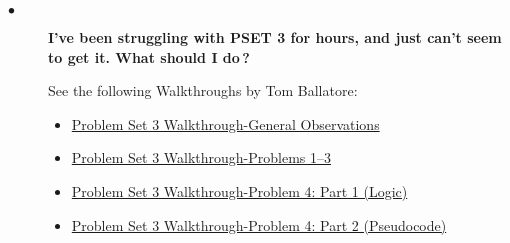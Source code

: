 \documentclass{article}
\newcommand{\link}[2]{\textcolor{blue}{\href{#2}{#1}}}
\newcommand{\question}[1]{\item[$\bullet$] 
	\begin{minipage}[t]{\textwidth}
		\bfseries#1
	\end{minipage}
	\hfil
}
\newenvironment{answer}{}{}
\newenvironment{faq}{\begin{description}}{\end{description}}
\begin{document}
\begin{faq}
		\question{I've been struggling with PSET 3 for hours, and just can't seem to get it.  What should I do\,?}
		\begin{answer}
			See the following Walkthroughs by Tom Ballatore:
			\begin{itemize}
				\item[] \link{Problem Set 3 Walkthrough-General Observations}{https://www.youtube.com/watch?v=W1k10qprERg\&index=8\&list=PL4e66Kzl1JCF0rL\_uq-w2yPBP3mDsm7iD\&t=0s}
				
				\item[] \link{Problem Set 3 Walkthrough-Problems 1--3}{https://www.youtube.com/watch?v=FKRPKI\_HH-0\&index=9\&list=PL4e66Kzl1JCF0rL\_uq-w2yPBP3mDsm7iD\&t=0s}
				
				\item[] \link{Problem Set 3 Walkthrough-Problem 4: Part 1 (Logic)}{https://www.youtube.com/watch?v=C7nRPJS7590\&index=10\&list=PL4e66Kzl1JCF0rL\_uq-w2yPBP3mDsm7iD\&t=0s}
				
				\item[] \link{Problem Set 3 Walkthrough-Problem 4: Part 2 (Pseudocode)}{https://www.youtube.com/watch?v=y2yR8JvQbRo\&index=11\&list=PL4e66Kzl1JCF0rL\_uq-w2yPBP3mDsm7iD\&t=0s}
			\end{itemize}
		\end{answer}
	\end{faq}
	
\end{document}
